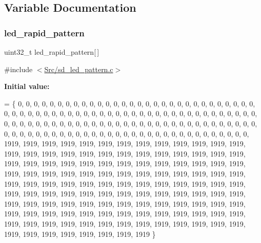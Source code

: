 \subsection{Variable Documentation}
\mbox{\label{group___s_d___l_e_d___pattern___definitions_gaaf958cbda7044776ff2c95480a8a7255}} 
\subsubsection{\texorpdfstring{led\+\_\+rapid\+\_\+pattern}{led\_rapid\_pattern}}
{\footnotesize\ttfamily uint32\+\_\+t led\+\_\+rapid\+\_\+pattern\mbox{[}$\,$\mbox{]}\hspace{0.3cm}{\ttfamily [static]}}



{\ttfamily \#include $<$\mbox{\hyperlink{sd__led__pattern_8c}{Src/sd\+\_\+led\+\_\+pattern.\+c}}$>$}

{\bfseries Initial value\+:}
\begin{DoxyCode}
= \{
   0,    0,    0,    0,    0,    0,    0,    0,    0,    0,    0,    0,    0,    0,    0,    0,    0,    0,
          0,    0,    0,    0,    0,    0,    0, 
   0,    0,    0,    0,    0,    0,    0,    0,    0,    0,    0,    0,    0,    0,    0,    0,    0,    0,
          0,    0,    0,    0,    0,    0,    0, 
   0,    0,    0,    0,    0,    0,    0,    0,    0,    0,    0,    0,    0,    0,    0,    0,    0,    0,
          0,    0,    0,    0,    0,    0,    0, 
   0,    0,    0,    0,    0,    0,    0,    0,    0,    0,    0,    0,    0,    0,    0,    0,    0,    0,
          0,    0,    0,    0,    0,    0,    0, 
   0,    0,    0,    0,    0,    0,    0,    0,    0,    0,    0,    0,    0,    0,    0,    0,    0,    0,
          0,    0,    0,    0,    0,    0,    0, 
1919, 1919, 1919, 1919, 1919, 1919, 1919, 1919, 1919, 1919, 1919, 1919, 1919, 1919, 1919, 1919, 1919, 1919,
       1919, 1919, 1919, 1919, 1919, 1919, 1919, 
1919, 1919, 1919, 1919, 1919, 1919, 1919, 1919, 1919, 1919, 1919, 1919, 1919, 1919, 1919, 1919, 1919, 1919,
       1919, 1919, 1919, 1919, 1919, 1919, 1919, 
1919, 1919, 1919, 1919, 1919, 1919, 1919, 1919, 1919, 1919, 1919, 1919, 1919, 1919, 1919, 1919, 1919, 1919,
       1919, 1919, 1919, 1919, 1919, 1919, 1919, 
1919, 1919, 1919, 1919, 1919, 1919, 1919, 1919, 1919, 1919, 1919, 1919, 1919, 1919, 1919, 1919, 1919, 1919,
       1919, 1919, 1919, 1919, 1919, 1919, 1919, 
1919, 1919, 1919, 1919, 1919, 1919, 1919, 1919, 1919, 1919, 1919, 1919, 1919, 1919, 1919, 1919, 1919, 1919,
       1919, 1919, 1919, 1919, 1919, 1919, 1919
\}
\end{DoxyCode}


